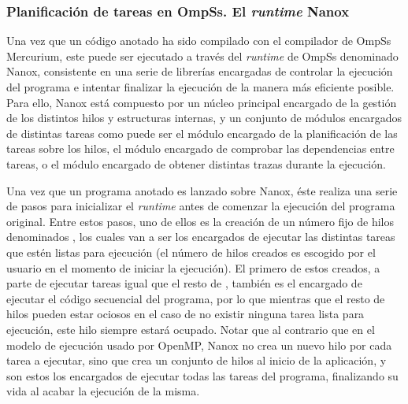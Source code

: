 \subsubsection{Planificación de tareas en OmpSs. El \emph{runtime} Nanox}

Una vez que un código anotado ha sido compilado con el compilador de OmpSs
Mercurium, este puede ser ejecutado a través del \emph{runtime} de OmpSs
denominado Nanox, consistente en una serie de librerías encargadas de
controlar la ejecución del programa e intentar finalizar la ejecución de la
manera más eficiente posible. Para ello, Nanox está compuesto por un núcleo
principal encargado de la gestión de los distintos hilos y estructuras
internas, y un conjunto de módulos encargados de distintas tareas como
puede ser el módulo encargado de la planificación de las tareas sobre los
hilos, el módulo encargado de comprobar las dependencias entre tareas, o el
módulo encargado de obtener distintas trazas durante la ejecución.

Una vez que un programa anotado es lanzado sobre Nanox, éste realiza una
serie de pasos para inicializar el \emph{runtime} antes de comenzar la
ejecución del programa original. Entre estos pasos, uno de ellos es la
creación de un número fijo de hilos denominados \wts, los cuales van a ser
los encargados de ejecutar las distintas tareas que estén listas para
ejecución (el número de hilos creados es escogido por el usuario en el
momento de iniciar la ejecución). El primero de estos \wts creados, a parte
de ejecutar tareas igual que el resto de \wts, también es el encargado de
ejecutar el código secuencial del programa, por lo que mientras que el
resto de hilos pueden estar ociosos en el caso de no existir ninguna tarea
lista para ejecución, este hilo siempre estará ocupado. Notar que al
contrario que en el modelo de ejecución usado por OpenMP, Nanox no crea un
nuevo hilo por cada tarea a ejecutar, sino que crea un conjunto de hilos al
inicio de la aplicación, y son estos los encargados de ejecutar todas las
tareas del programa, finalizando su vida al acabar la ejecución de la misma.

